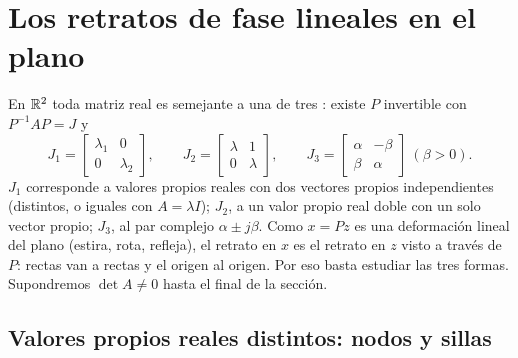 \section{Los retratos de fase lineales en el plano}
\label{sec:bi-clasificacion}

En $\mathbb{R}^2$ toda matriz real es semejante a una de tres : existe $P$ invertible con $P^{-1}AP=J$ y
\begin{equation}
  J_1=\begin{bmatrix}\lambda_1&0\\0&\lambda_2\end{bmatrix},\qquad
  J_2=\begin{bmatrix}\lambda&1\\0&\lambda\end{bmatrix},\qquad
  J_3=\begin{bmatrix}\alpha&-\beta\\\beta&\alpha\end{bmatrix}\ (\beta>0) .
  \label{eq:bi-jordan}
\end{equation}
$J_1$ corresponde a valores propios reales con dos vectores propios independientes (distintos, o iguales con $A=\lambda I$); $J_2$, a un valor propio real doble con un solo vector propio; $J_3$, al par complejo $\alpha\pm j\beta$. Como $x=Pz$ es una deformación lineal del plano (estira, rota, refleja), el retrato en $x$ es el retrato en $z$ visto a través de $P$: rectas van a rectas y el origen al origen. Por eso basta estudiar las tres formas. Supondremos $\det A\neq0$ hasta el final de la sección.

\subsection{Valores propios reales distintos: nodos y sillas}

